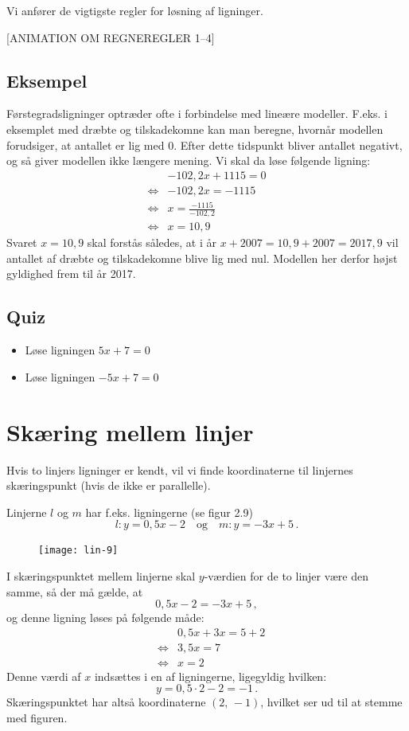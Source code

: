 \documentclass[12pt,oneside,a4paper]{article}
\newcommand{\bas}{\begin{eqnarray*}}
\newcommand{\eas}{\end{eqnarray*}}
\begin{document}
Vi anfører de vigtigste regler for løsning af ligninger.

[ANIMATION OM REGNEREGLER 1--4]

\subsection{Eksempel}
Førstegradsligninger optræder ofte i forbindelse med lineære modeller. F.eks. i
eksemplet med dræbte og tilskadekomne kan man beregne, hvornår modellen
forudsiger, at antallet er lig med 0.  Efter dette tidspunkt bliver antallet
negativt, og så giver modellen ikke længere mening.  Vi skal da løse følgende
ligning:
\[
\begin{aligned}
    & -102,2x+1115 = 0  \\
    \iff & -102,2x = -1115 \\
    \iff & x = \frac{-1115}{-102,2} \\
    \iff & x = 10,9
\end{aligned}
\]
Svaret $x=10,9$ skal forstås således, at i år $x + 2007 = 10,9 + 2007 = 2017,9$
vil antallet af dræbte og tilskadekomne blive lig med nul. Modellen her derfor
højst gyldighed frem til år 2017.


\subsection{Quiz}
\begin{itemize}
    \item Løse ligningen $5x+7 = 0$
    \item Løse ligningen $-5x+7 = 0$
\end{itemize}



\section{Skæring mellem linjer}
Hvis to linjers ligninger er kendt, vil vi finde koordinaterne til linjernes
skæringspunkt (hvis de ikke er parallelle).

Linjerne $l$ og $m$ har f.eks. ligningerne (se figur 2.9)
\[
    l: y=0,5x-2\quad{\mbox{og}}\quad m: y=-3x+5 \,.
\]

\begin{figure}[H]
    \centering
    \texttt{[image: lin-9]}
\end{figure}

I skæringspunktet mellem linjerne skal $y$-værdien for de to linjer være den
samme, så der må gælde, at
\[
0,5x-2 = -3x+5 \,,
\]
og denne ligning løses på følgende måde:
\bas
&& 0,5x+3x=5+2\\
&\iff& 3,5x=7\\
&\iff& x=2
\eas
Denne værdi af $x$ indsættes i en af ligningerne, ligegyldig hvilken:
\[
y=0,5\cdot2-2=-1 \,.
\]
Skæringspunktet har altså koordinaterne $(2,\,-1)$, hvilket ser ud til at
stemme med figuren.
\end{document}
